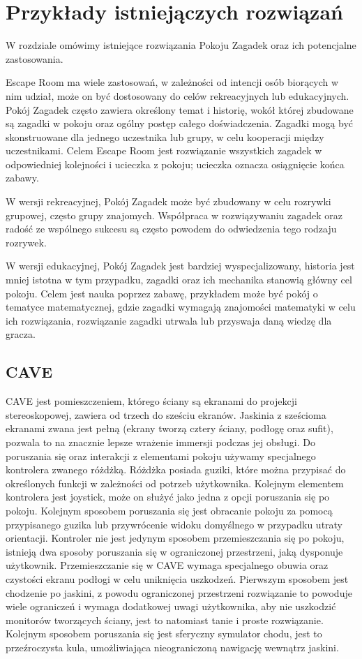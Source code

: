 \chapter{Przykłady istniejączych rozwiązań}
\label{chap:field}

W rozdziale omówimy istniejące rozwiązania Pokoju Zagadek oraz ich potencjalne zastosowania.

Escape Room ma wiele zastosowań, w zależności od intencji osób biorących w nim udział, może on być dostosowany do celów rekreacyjnych lub edukacyjnych. Pokój Zagadek często zawiera określony temat i historię, wokół której zbudowane są zagadki w pokoju oraz ogólny postęp całego doświadczenia. 
Zagadki mogą być skonstruowane dla jednego uczestnika lub grupy, w celu kooperacji między uczestnikami. Celem Escape Room jest rozwiązanie wszystkich zagadek w odpowiedniej kolejności i ucieczka z pokoju; ucieczka oznacza osiągnięcie końca zabawy.

W wersji rekreacyjnej, Pokój Zagadek może być zbudowany w celu rozrywki grupowej, często grupy znajomych. Współpraca w rozwiązywaniu zagadek oraz radość ze wspólnego sukcesu są często powodem do odwiedzenia tego rodzaju rozrywek. 

W wersji edukacyjnej, Pokój Zagadek jest bardziej wyspecjalizowany, historia jest mniej istotna w tym przypadku, zagadki oraz ich mechanika stanowią główny cel pokoju.
Celem jest nauka poprzez zabawę, przykładem może być pokój o tematyce matematycznej, gdzie zagadki wymagają znajomości matematyki w celu ich rozwiązania, rozwiązanie zagadki utrwala lub przyswaja daną wiedzę dla gracza.

\section{CAVE}
CAVE jest pomieszczeniem, którego ściany są ekranami do projekcji stereoskopowej, zawiera od trzech do sześciu ekranów.
Jaskinia z sześcioma ekranami zwana jest pełną (ekrany tworzą cztery ściany, podłogę oraz sufit), pozwala to na znacznie lepsze wrażenie immersji podczas jej obsługi.
Do poruszania się oraz interakcji z elementami pokoju używamy specjalnego kontrolera zwanego różdżką. Różdżka posiada guziki, które można przypisać do określonych funkcji w zależności od potrzeb użytkownika. Kolejnym elementem kontrolera jest joystick, może on służyć jako jedna z opcji poruszania się po pokoju. Kolejnym sposobem poruszania się jest obracanie pokoju za pomocą przypisanego guzika lub przywrócenie widoku domyślnego w przypadku utraty orientacji.
Kontroler nie jest jedynym sposobem przemieszczania się po pokoju, istnieją dwa sposoby poruszania się w ograniczonej przestrzeni, jaką dysponuje użytkownik. Przemieszczanie się w CAVE wymaga specjalnego obuwia oraz czystości ekranu podłogi w celu uniknięcia uszkodzeń. Pierwszym sposobem jest chodzenie po jaskini, z powodu ograniczonej przestrzeni rozwiązanie to powoduje wiele ograniczeń i wymaga dodatkowej uwagi użytkownika, aby nie uszkodzić monitorów tworzących ściany, jest to natomiast tanie i proste rozwiązanie.
Kolejnym sposobem poruszania się jest sferyczny symulator chodu, jest to przeźroczysta kula, umożliwiająca nieograniczoną nawigację wewnątrz jaskini.

